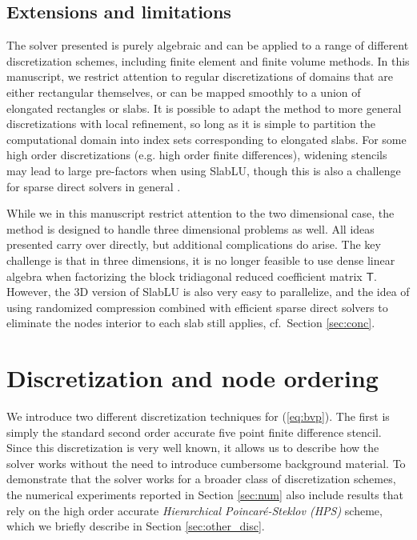 \documentclass[11pt]{amsart}
\newcommand{\mtx}[1]{\bm{\mathsf{#1}}}
\begin{document}
\subsection{Extensions and limitations}

The solver presented is purely algebraic and can be applied to a range of different discretization schemes, including finite element and finite volume methods. 
In this manuscript, we restrict attention to regular discretizations of domains that are either rectangular themselves, 
or can be mapped smoothly to a union of elongated rectangles or slabs.
It is possible to adapt the method to more general discretizations with local refinement,
so long as it is simple to partition the computational domain into index sets corresponding to elongated slabs.
For some high order discretizations (e.g. high order finite differences), widening stencils may lead to large pre-factors when using
SlabLU, though this is also a challenge for sparse direct solvers in general \cite[Ch.~20]{2019_martinsson_book}.

While we in this manuscript restrict attention to the two dimensional case, the method is designed to handle three dimensional problems as well. 
All ideas presented carry over directly, but additional complications do arise. 
The key challenge is that in three dimensions, it is no longer feasible to use dense linear algebra when factorizing the block tridiagonal reduced coefficient matrix $\mtx{T}$.
However, the 3D version of SlabLU is also very easy to parallelize, and the idea of using randomized compression combined with efficient sparse direct solvers to eliminate the nodes interior to each slab still applies, cf.~Section \ref{sec:conc}.

\section{Discretization and node ordering}

We introduce two different discretization techniques for
(\ref{eq:bvp}). The first is simply the standard second order accurate
five point finite difference stencil. Since this discretization is very 
well known, it allows us to describe how the solver works without the need
to introduce cumbersome background material. To demonstrate that the solver
works for a broader class of discretization schemes, the numerical experiments
reported in Section \ref{sec:num} also include results that rely on the high 
order accurate \textit{Hierarchical Poincar\'e-Steklov (HPS)} scheme, which
we briefly describe in Section \ref{sec:other_disc}.
\end{document}
